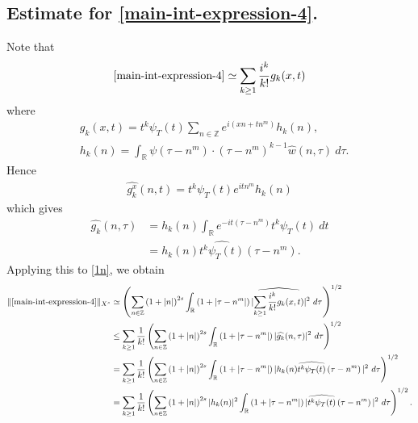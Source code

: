 \documentclass[12pt,reqno]{amsart}
\numberwithin{equation}{section}  %
\numberwithin{figure}{section}
\newcommand{\rr}{\mathbb{R}}
\newcommand{\zz}{\mathbb{Z}}
\newcommand{\wh}{\widehat}
\theoremstyle{plain}
\theoremstyle{definition}
\theoremstyle{remark}
\begin{document}
\subsection{Estimate for \eqref{main-int-expression-4}.}
Note that
%
%
\begin{equation}
	\label{1n}
	\begin{split}
		\eqref{main-int-expression-4} \simeq \sum_{k \ge 1}
		\frac{i^k}{k!}g_k(x,t)
	\end{split}
\end{equation}
%
%
where 
%
%
\begin{equation*}
	\begin{split}
		& g_k(x,t) = t^k \psi_{T}(t) \sum_{n \in \zz} e^{i\left( xn + tn^{m}
		\right)} h_k(n),
		\\
		& h_k(n) = \int_\rr \psi \left( \tau - n^{m } \right) \cdot \left(
		\tau - n^{m } \right)^{k -1} \wh{w}(n, \tau) \ d \tau.
	\end{split}
\end{equation*}
%
%
Hence
%
%
\begin{equation*}
	\begin{split}
		\wh{g_k^x}(n, t) = t^{k} \psi_{T}(t) e^{i t n^{m }} h_k(n)
	\end{split}
\end{equation*}
%
%
which gives
%
%
\begin{equation*}
	\begin{split}
		\wh{g_k}(n, \tau)
		& = h_k(n) \int_\rr e^{-it\left( \tau - n^{m } \right)}
		t^{k}\psi_{T}(t) \ dt
		\\
		& = h_k(n) \wh{t^{k}\psi_{T}(t)} \left( \tau - n^{m } \right).
	\end{split}
\end{equation*}
%
%
Applying this to \eqref{1n}, we obtain
%
%
\begin{equation}
	\label{2n}
	\begin{split}
		\|\eqref{main-int-expression-4}\|_{X^s} 
		& \simeq \left( \sum_{n \in \zz} \left (1 + |n| \right )^{2s} \int_\rr \left( 1 + | \tau -
		n^{m }
		|
		\right) | \wh{\sum_{k \ge 1} \frac{i^k}{k!}g_k(x,t)} |^2 \ d \tau
		\right)^{1/2}
		\\
		& \le \sum_{k \ge 1} \frac{1}{k!}\left( \sum_{n \in \zz} \left (1 + |n| \right )^{2s}
		\int_\rr \left( 1 + | \tau - n^{m } | \right) | \wh{g_k}(n, \tau) |^2 \
		d \tau \right)^{1/2}
		\\
		& = \sum_{k \ge 1} \frac{1}{k!} \left( \sum_{n \in \zz} \left (1 + |n| \right )^{2s}
		\int_\rr \left( 1 + | \tau - n^{m } | \right) | h_k(n) \wh{t^k
		\psi_{T}(t)} \left( \tau - n^{m } \right) |^2 \ d \tau \right)^{1/2}
		\\
		& = \sum_{k \ge 1} \frac{1}{k!} \left( \sum_{n \in \zz} \left (1 + |n| \right )^{2s} |
		h_k(n) |^2 \int_\rr \left( 1 + | \tau - n^{m } | \right) | \wh{t^k
		\psi_{T}(t)} \left( \tau - n^{m } \right) |^2 \ d \tau \right)^{1/2}.
	\end{split}
\end{equation}
\end{document}
